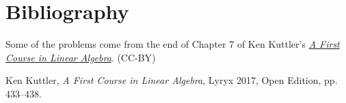 \documentclass{ximera}
\begin{document}
\section*{Bibliography}
Some of the problems come from the end of Chapter 7 of Ken Kuttler's \href{https://open.umn.edu/opentextbooks/textbooks/a-first-course-in-linear-algebra-2017}{\it A First Course in Linear Algebra}. (CC-BY)

Ken Kuttler, {\it  A First Course in Linear Algebra}, Lyryx 2017, Open Edition, pp. 433--438. 
\end{document}
